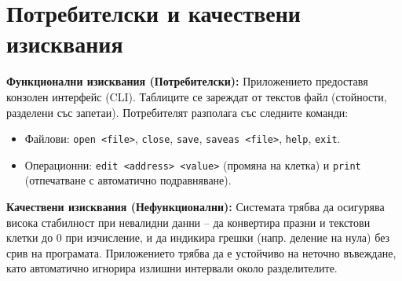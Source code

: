 \section{Потребителски и качествени изисквания}

\textbf{Функционални изисквания (Потребителски):}
Приложението предоставя конзолен интерфейс (CLI). Таблиците се зареждат от текстов файл (стойности, разделени със запетаи). Потребителят разполага със следните команди:
\begin{itemize}
  \item Файлови: \texttt{open <file>}, \texttt{close}, \texttt{save}, \texttt{saveas <file>}, \texttt{help}, \texttt{exit}.
  \item Операционни: \texttt{edit <address> <value>} (промяна на клетка) и \texttt{print} (отпечатване с автоматично подравняване).
\end{itemize}

\textbf{Качествени изисквания (Нефункционални):}
Системата трябва да осигурява висока стабилност при невалидни данни – да конвертира празни и текстови клетки до 0 при изчисление, и да индикира грешки (напр. деление на нула) без срив на програмата. Приложението трябва да е устойчиво на неточно въвеждане, като автоматично игнорира излишни интервали около разделителите.